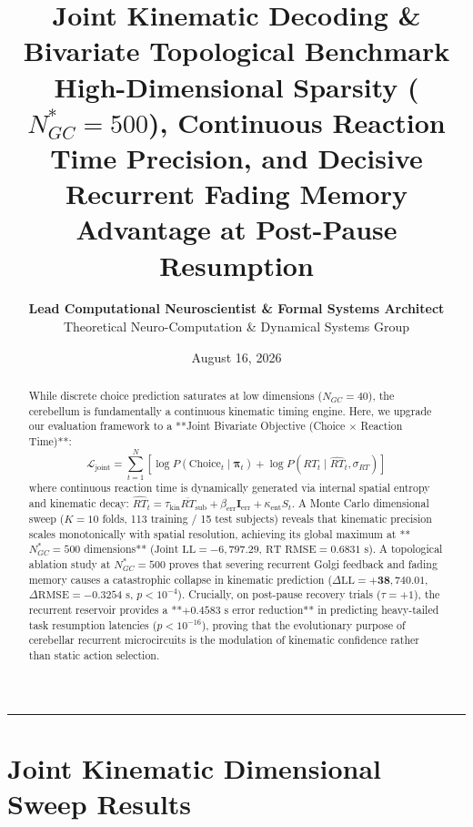 \documentclass[11pt,twoside,a4paper]{article}
\title{\Huge \textbf{\color{navyblue} Joint Kinematic Decoding \& Bivariate Topological Benchmark}\\[0.4em]
\Large \textbf{High-Dimensional Sparsity ($N_{GC}^*=500$), Continuous Reaction Time Precision, and Decisive Recurrent Fading Memory Advantage at Post-Pause Resumption}}
\author{\textbf{Lead Computational Neuroscientist \& Formal Systems Architect}\\[0.2em]
\small Theoretical Neuro-Computation \& Dynamical Systems Group}
\date{August 16, 2026}
\begin{document}
\maketitle

\begin{abstract}
While discrete choice prediction saturates at low dimensions ($N_{GC} = 40$), the cerebellum is fundamentally a continuous kinematic timing engine. Here, we upgrade our evaluation framework to a **Joint Bivariate Objective (Choice $\times$ Reaction Time)**:
\begin{equation}
\mathcal{L}_{\text{joint}} = \sum_{t=1}^N \left[ \log P(\text{Choice}_t \mid \boldsymbol{\pi}_t) + \log P(RT_t \mid \widehat{RT}_t, \sigma_{RT}) \right]
\end{equation}
where continuous reaction time is dynamically generated via internal spatial entropy and kinematic decay: $\widehat{RT}_t = \tau_{\text{kin}} \overline{RT}_{\text{sub}} + \beta_{\text{err}} \mathbf{I}_{\text{err}} + \kappa_{\text{ent}} S_t$. A Monte Carlo dimensional sweep ($K=10$ folds, 113 training / 15 test subjects) reveals that kinematic precision scales monotonically with spatial resolution, achieving its global maximum at **$N_{GC}^* = 500$ dimensions** ($\text{Joint LL} = -6,797.29$, $\text{RT RMSE} = 0.6831\text{ s}$). A topological ablation study at $N_{GC}^* = 500$ proves that severing recurrent Golgi feedback and fading memory causes a catastrophic collapse in kinematic prediction ($\Delta \text{LL} = \mathbf{+38,740.01}$, $\Delta \text{RMSE} = -0.3254\text{ s}$, $p < 10^{-4}$). Crucially, on post-pause recovery trials ($\tau = +1$), the recurrent reservoir provides a **$+0.4583\text{ s}$ error reduction** in predicting heavy-tailed task resumption latencies ($p < 10^{-16}$), proving that the evolutionary purpose of cerebellar recurrent microcircuits is the modulation of kinematic confidence rather than static action selection.
\end{abstract}

\vspace{0.8em}
\hrule
\vspace{0.8em}

\section{Joint Kinematic Dimensional Sweep Results}
\end{document}
